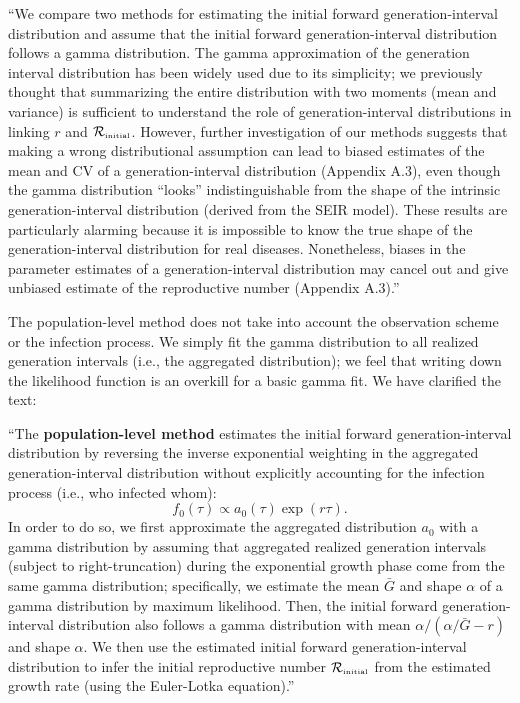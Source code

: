 ``We compare two methods for estimating the initial forward generation-interval distribution and assume that the initial forward generation-interval distribution follows a gamma distribution.
The gamma approximation of the generation interval distribution has been widely used due to its simplicity;
we previously thought that summarizing the entire distribution with two moments (mean and variance) is sufficient to understand the role of generation-interval distributions in linking $r$ and ${\cal R}_{\textrm{\tiny initial}}$.
However, further investigation of our methods suggests that making a wrong distributional assumption can lead to biased estimates of the mean and CV of a generation-interval distribution (Appendix A.3), even though the gamma distribution ``looks'' indistinguishable from the shape of the intrinsic generation-interval distribution (derived from the SEIR model).
These results are particularly alarming because it is impossible to know the true shape of the generation-interval distribution for real diseases.
Nonetheless, biases in the parameter estimates of a generation-interval distribution may cancel out and give unbiased estimate of the reproductive number (Appendix A.3).''


The population-level method does not take into account the observation scheme or the infection process. 
We simply fit the gamma distribution to all realized generation intervals (i.e., the aggregated distribution);
we feel that writing down the likelihood function is an overkill for a basic gamma fit.
We have clarified the text: 

``The \textbf{population-level method} estimates the initial forward generation-interval distribution by reversing the inverse exponential weighting in the aggregated generation-interval distribution without explicitly accounting for the infection process (i.e., who infected whom):
\begin{equation}
f_0(\tau) \propto a_0(\tau) \exp(r\tau).
\end{equation}
In order to do so, we first approximate the aggregated distribution $a_0$ with a gamma distribution by assuming that aggregated realized generation intervals (subject to right-truncation) during the exponential growth phase come from the same gamma distribution;
specifically, we estimate the mean $\bar G$ and shape $\alpha$ of a gamma distribution by maximum likelihood.
Then, the initial forward generation-interval distribution also follows a gamma distribution with mean $\alpha/(\alpha/\bar G - r)$ and shape $\alpha$.
We then use the estimated initial forward generation-interval distribution to infer the initial reproductive number ${\cal R}_{\textrm{\tiny initial}}$ from the estimated growth rate (using the Euler-Lotka equation).''

